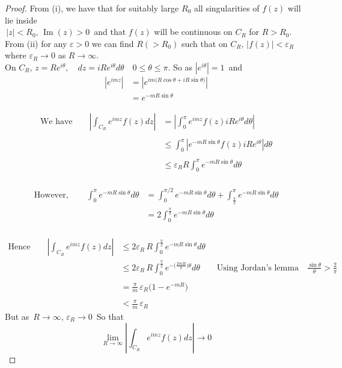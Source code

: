 \documentclass[11pt,a4paper]{article}
\theoremstyle{definition}
\begin{document}
\begin{proof}
From (i), we have that for suitably large $R_0$ all singularities of $f(z)$ will lie inside\\ $\,\left|z\right|< R_0,\, \operatorname{Im} (z)> 0\,$ and  that $f(z)$ will be continuous on $C_R$ for $R> R_0$.\\

From (ii) for any $\varepsilon > 0$ we can find $R(>R_0)$ such that on $C_R,\,\left|f(z)\right| < \varepsilon_R$ where $\varepsilon_R \longrightarrow 0$ as $R\longrightarrow \infty$.\\
On $C_R,\, z = Re^{i\theta},\quad  dz = iRe^{i\theta}d\theta\quad  0 \leq \theta \leq \pi$. So as $\left|e^{i\theta}\right| = 1\,$ and 
\begin{align*}
\left|e^{imz}\right| & = \left|e^{im\big(R\cos \theta + iR\sin \theta\big)}\right|\\
& = e^{-mR\sin \theta}
\end{align*} 

\begin{align*}
\text{We have}\qquad \left|\displaystyle{\int_{C_R}}e^{imz}f(z)dz\right| & = \left|\displaystyle{\int^{\pi}_0 e^{imz}f(z) iRe^{i\theta} d\theta}\right|\\\\
& \leq \int^{\pi}_0\left|e^{-mR\sin \theta} f(z) iRe^{i\theta}\right|d\theta\\\\
& \leq \varepsilon_R R \int^{\pi}_0e^{-mR\sin \theta}d\theta\\
\end{align*}



\begin{align*}
\text{However},\qquad  \int^{\pi}_0e^{-mR\sin \theta}d\theta & = \int^{\pi/2}_0e^{-mR\sin \theta}d\theta + \int^{\pi}_{\frac{\pi}{2}}e^{-mR\sin \theta}d\theta\\
& = 2\int^{\frac{\pi}{2}}_0e^{-mR\sin \theta}d\theta\\
\end{align*}



\begin{align*}
\text{Hence}\qquad  \left|\displaystyle{\int_{C_R}} e^{imz}f(z)dz\right| & \leq 2\varepsilon_R\, R \int^{\frac{\pi}{2}}_0e^{-mR\sin \theta}d\theta\\
& \leq 2 \varepsilon_R\,R\int_0^{\frac{\pi}{2}} e^{-\Big(\frac{2mR}{\pi}\Big)\theta}d\theta\qquad \text{Using Jordan's lemma}\quad \frac{\sin\theta}{\theta} > \frac{2}{\pi}\\\\
& = \frac{\pi}{m}\,\varepsilon_R\Big(1 - e^{-mR}\Big)\\\\
& < \frac{\pi}{m}\,\varepsilon_R
\end{align*}
But as $\, R\longrightarrow \infty, \, \varepsilon_R \longrightarrow 0\,$ So that 
$$\lim\limits_{R\longrightarrow \infty}\left|\displaystyle{\int_{C_R}} e^{imz} f(z)dz\right| \longrightarrow 0$$
\end{proof}
\end{document}
